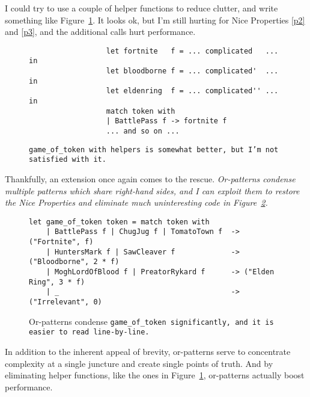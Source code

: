 \documentclass[manuscript,screen,review, 12pt, nonacm]{acmart}
\begin{document}
        I could try to use a couple of helper functions to reduce clutter, and
        write something like Figure~\ref{fig:helpergot}. It looks ok, but I'm
        still hurting for Nice Properties \ref{p2} and \ref{p3}, and the
        additional calls hurt performance. 

        \begin{figure}
            \begin{center}
                \begin{verbatim}
                  let fortnite   f = ... complicated   ... in
                  let bloodborne f = ... complicated'  ... in
                  let eldenring  f = ... complicated'' ... in
                  match token with
                  | BattlePass f -> fortnite f
                  ... and so on ...                
                \end{verbatim}
            \end{center}    
        \caption{\tt{game\_of\_token} with helpers is somewhat better, but I'm
        not satisfied with it.} 
        \label{fig:helpergot}
        \end{figure}

        Thankfully, an extension once again comes to the rescue.
        \it{Or-patterns} condense multiple patterns which share right-hand
        sides, and I can exploit them to restore the Nice Properties and
        eliminate much uninteresting code in Figure~\ref{fig:orgot}.

    \begin{figure}
    \begin{center}
    \begin{verbatim}
let game_of_token token = match token with 
    | BattlePass f | ChugJug f | TomatoTown f  -> ("Fortnite", f)
    | HuntersMark f | SawCleaver f             -> ("Bloodborne", 2 * f)
    | MoghLordOfBlood f | PreatorRykard f      -> ("Elden Ring", 3 * f)
    | _                                        -> ("Irrelevant", 0)
    \end{verbatim}
    \end{center}    
    \caption{Or-patterns condense \tt{game\_of\_token}
    significantly, and it is easier to read line-by-line.} 
    \label{fig:orgot}
    \end{figure}

    In addition to the inherent appeal of brevity, or-patterns serve to
    concentrate complexity at a single juncture and create single points of
    truth. And by eliminating helper functions, like the ones in
    Figure~\ref{fig:helpergot}, or-patterns actually boost performance.
      
\end{document}
